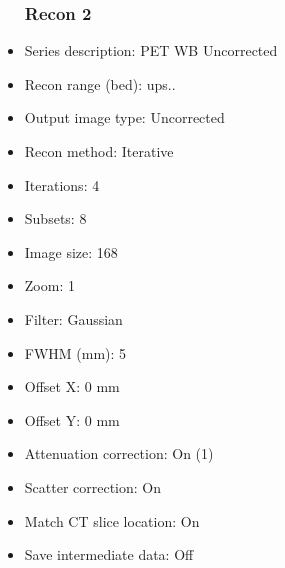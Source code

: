 \documentclass[12pt]{article}
\begin{document}
\begin{itemize}
\subsubsection{Recon 2}
\item Series description: PET WB Uncorrected
\item Recon range (bed): ups..
\item Output image type: Uncorrected
\item Recon method: Iterative
\item Iterations: 4
\item Subsets: 8
\item Image size: 168
\item Zoom: 1
\item Filter: Gaussian
\item FWHM (mm): 5
\item Offset X: 0 mm
\item Offset Y: 0 mm
\item Attenuation correction: On (1)
\item Scatter correction: On
\item Match CT slice location: On
\item Save intermediate data: Off
\end{itemize}
\end{document}
